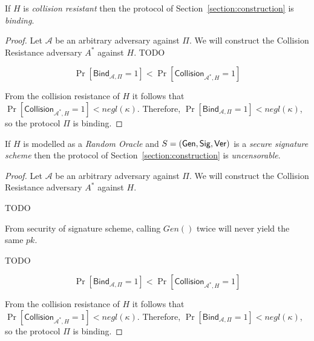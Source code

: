 \begin{theorem}
  If $H$ is \emph{collision resistant} then the protocol of Section~\ref{section:construction} is \emph{binding}.
\end{theorem}
\begin{proof}
  Let $\mathcal{A}$ be an arbitrary adversary against $\Pi$.
  We will construct the Collision Resistance adversary $A^*$ against $H$.
  TODO

  \[
    \Pr[\textsf{Bind}_{\mathcal{A},\Pi} = 1]
    <
    \Pr[\textsf{Collision}_{\mathcal{A}^*,H} = 1]
  \]

  From the collision resistance of $H$ it follows that $\Pr[\textsf{Collision}_{\mathcal{A}^*,H} = 1] < negl(\kappa)$. Therefore,
  $\Pr[\textsf{Bind}_{\mathcal{A},\Pi} = 1] < negl(\kappa)$, so
  the protocol $\Pi$ is binding.
\end{proof}

\begin{theorem}
  If $H$ is modelled as a \emph{Random Oracle} and $S = (\mathsf{Gen}, \mathsf{Sig}, \mathsf{Ver})$ is a \emph{secure signature scheme} then the protocol of Section~\ref{section:construction} is \emph{uncensorable}.
\end{theorem}
\begin{proof}
  Let $\mathcal{A}$ be an arbitrary adversary against $\Pi$.
  We will construct the Collision Resistance adversary $A^*$ against $H$.

  TODO

  From security of signature scheme, calling $Gen()$ twice will never yield the same $pk$.

  TODO

  \[
    \Pr[\textsf{Bind}_{\mathcal{A},\Pi} = 1]
    <
    \Pr[\textsf{Collision}_{\mathcal{A}^*,H} = 1]
  \]

  From the collision resistance of $H$ it follows that $\Pr[\textsf{Collision}_{\mathcal{A}^*,H} = 1] < negl(\kappa)$. Therefore,
  $\Pr[\textsf{Bind}_{\mathcal{A},\Pi} = 1] < negl(\kappa)$, so
  the protocol $\Pi$ is binding.
\end{proof}
